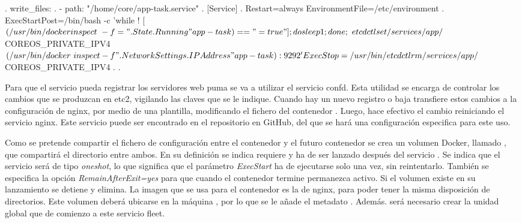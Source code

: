 \begin{codelisting}
\label{code:execstartpost-app-task}
\begin{code}
.
write_files:
.
  - path: "/home/core/app-task.service"
    .
    [Service] 
      .
      Restart=always     
      EnvironmentFile=/etc/environment
      .
      ExecStartPost=/bin/bash -c 'while ! [ $(/usr/bin/docker inspect \
      -f ="{{.State.Running}}" app-task) == "=true" ]; do sleep 1; done; \
      etcdctl set /services/app/${COREOS_PRIVATE_IPV4} $(/usr/bin/docker \
      inspect -f "{{ .NetworkSettings.IPAddress }}" app-task):9292'
      ExecStop=/usr/bin/etcdctl rm /services/app/${COREOS_PRIVATE_IPV4}
      .
.
\end{code}
\end{codelisting}

Para que el servicio  pueda registrar los servidores web puma se va a utilizar el servicio confd. Esta utilidad se encarga de controlar los cambios que se produzcan en etc2, vigilando las claves que se le indique. Cuando hay un nuevo registro o baja transfiere estos cambios a la configuración de nginx, por medio de una plantilla, modificando el fichero  del contenedor . Luego, hace efectivo el cambio reiniciando el servicio nginx. Este servicio puede ser encontrado en el repositorio  en GitHub, del que se hará una configuración especifica para este uso.

Como se pretende compartir el fichero de configuración  entre el contenedor  y el futuro contenedor  se crea un volumen Docker, llamado , que compartirá el directorio  entre ambos. En su definición se indica requiere y ha de ser lanzado después del servicio . Se indica que el servicio será de tipo \textit{oneshot}, lo que significa que el parámetro \textit{ExecStart} ha de ejecutarse solo una vez, sin reintentarlo. También se especifica la opción \textit{RemainAfterExit=yes} para que cuando el contenedor termine permanezca activo. Si el volumen existe en su lanzamiento se detiene y elimina. La imagen que se usa para el contenedor es la de nginx, para poder tener la misma disposición de directorios. Este volumen deberá ubicarse en la máquina , por lo que se le añade el metadato . Además. será necesario crear la unidad global  que de comienzo a este servicio fleet.

